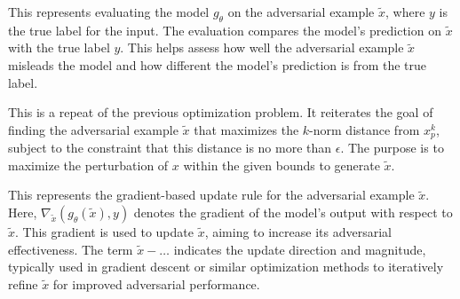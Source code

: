 This represents evaluating the model $g_{\theta}$ on the adversarial example $\tilde{x}$, where $y$ is the true label for the input. The evaluation compares the model’s prediction on $\tilde{x}$ with the true label $y$. This helps assess how well the adversarial example $\tilde{x}$ misleads the model and how different the model’s prediction is from the true label.

This is a repeat of the previous optimization problem. It reiterates the goal of finding the adversarial example $\tilde{x}$ that maximizes the $k$-norm distance from $x^k_p$, subject to the constraint that this distance is no more than $\epsilon$. The purpose is to maximize the perturbation of $x$ within the given bounds to generate $\tilde{x}$.

This represents the gradient-based update rule for the adversarial example $\tilde{x}$. Here, $\nabla_{\tilde{x}}(g_{\theta}(\tilde{x}), y)$ denotes the gradient of the model’s output with respect to $\tilde{x}$. This gradient is used to update $\tilde{x}$, aiming to increase its adversarial effectiveness. The term $\tilde{x} - \ldots$ indicates the update direction and magnitude, typically used in gradient descent or similar optimization methods to iteratively refine $\tilde{x}$ for improved adversarial performance.
